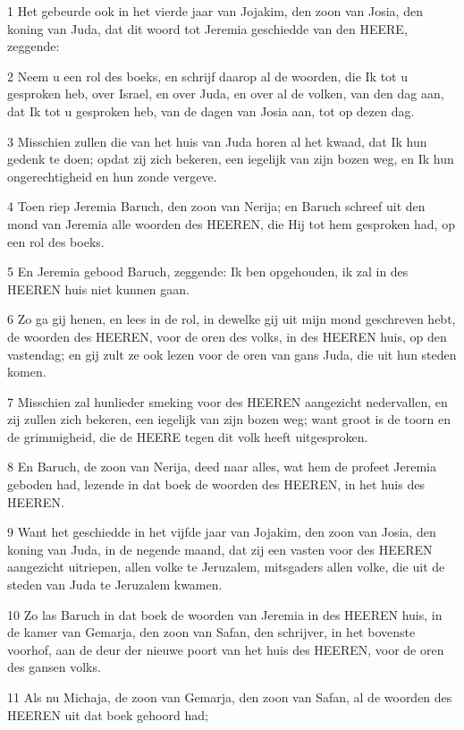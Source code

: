\par 1 Het gebeurde ook in het vierde jaar van Jojakim, den zoon van Josia, den koning van Juda, dat dit woord tot Jeremia geschiedde van den HEERE, zeggende:
\par 2 Neem u een rol des boeks, en schrijf daarop al de woorden, die Ik tot u gesproken heb, over Israel, en over Juda, en over al de volken, van den dag aan, dat Ik tot u gesproken heb, van de dagen van Josia aan, tot op dezen dag.
\par 3 Misschien zullen die van het huis van Juda horen al het kwaad, dat Ik hun gedenk te doen; opdat zij zich bekeren, een iegelijk van zijn bozen weg, en Ik hun ongerechtigheid en hun zonde vergeve.
\par 4 Toen riep Jeremia Baruch, den zoon van Nerija; en Baruch schreef uit den mond van Jeremia alle woorden des HEEREN, die Hij tot hem gesproken had, op een rol des boeks.
\par 5 En Jeremia gebood Baruch, zeggende: Ik ben opgehouden, ik zal in des HEEREN huis niet kunnen gaan.
\par 6 Zo ga gij henen, en lees in de rol, in dewelke gij uit mijn mond geschreven hebt, de woorden des HEEREN, voor de oren des volks, in des HEEREN huis, op den vastendag; en gij zult ze ook lezen voor de oren van gans Juda, die uit hun steden komen.
\par 7 Misschien zal hunlieder smeking voor des HEEREN aangezicht nedervallen, en zij zullen zich bekeren, een iegelijk van zijn bozen weg; want groot is de toorn en de grimmigheid, die de HEERE tegen dit volk heeft uitgesproken.
\par 8 En Baruch, de zoon van Nerija, deed naar alles, wat hem de profeet Jeremia geboden had, lezende in dat boek de woorden des HEEREN, in het huis des HEEREN.
\par 9 Want het geschiedde in het vijfde jaar van Jojakim, den zoon van Josia, den koning van Juda, in de negende maand, dat zij een vasten voor des HEEREN aangezicht uitriepen, allen volke te Jeruzalem, mitsgaders allen volke, die uit de steden van Juda te Jeruzalem kwamen.
\par 10 Zo las Baruch in dat boek de woorden van Jeremia in des HEEREN huis, in de kamer van Gemarja, den zoon van Safan, den schrijver, in het bovenste voorhof, aan de deur der nieuwe poort van het huis des HEEREN, voor de oren des gansen volks.
\par 11 Als nu Michaja, de zoon van Gemarja, den zoon van Safan, al de woorden des HEEREN uit dat boek gehoord had;
